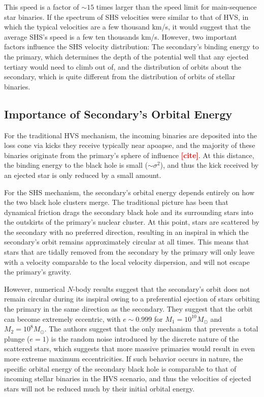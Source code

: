 \documentclass[a4paper,twocolumn]{emulateapj}
\newcommand{\colr}[1]{{\bf \textcolor{red}{[#1]}}}
\begin{document}
This speed is a factor of $\sim 15$ times larger than the speed limit for main-sequence star binaries. If the spectrum of SHS velocities were similar to that of HVS, in which the typical velocities are a few thousand km/s, it would suggest that the average SHS's speed is a few ten thousands km/s. However, two important factors influence the SHS velocity distribution: The secondary's binding energy to the primary, which determines the depth of the potential well that any ejected tertiary would need to climb out of, and the distribution of orbits about the secondary, which is quite different from the distribution of orbits of stellar binaries.

\subsection{Importance of Secondary's Orbital Energy}
For the traditional HVS mechanism, the incoming binaries are deposited into the loss cone via kicks they receive typically near apoapse, and the majority of these binaries originate from the primary's sphere of influence \colr{cite}. At this distance, the binding energy to the black hole is small ($\sim \sigma^{2}$), and thus the kick received by an ejected star is only reduced by a small amount.

For the SHS mechanism, the secondary's orbital energy depends entirely on how the two black hole clusters merge. The traditional picture has been that dynamical friction drags the secondary black hole and its surrounding stars into the outskirts of the primary's nuclear cluster. At this point, stars are scattered by the secondary with no preferred direction, resulting in an inspiral in which the secondary's orbit remains approximately circular at all times. This means that stars that are tidally removed from the secondary by the primary will only leave with a velocity comparable to the local velocity dispersion, and will not escape the primary's gravity.

However, numerical $N$-body results \citep{Iwasawa:2011a,Khan:2012a} suggest that the secondary's orbit does not remain circular during its inspiral owing to a preferential ejection of stars orbiting the primary in the same direction as the secondary. They suggest that the orbit can become extremely eccentric, with $e \sim 0.999$ for $M_{1} = 10^{10} M_{\odot}$ and $M_{2} = 10^{8} M_{\odot}$. The authors suggest that the only mechanism that prevents a total plunge ($e = 1$) is the random noise introduced by the discrete nature of the scattered stars, which suggests that more massive primaries would result in even more extreme maximum eccentricities. If such behavior occurs in nature, the specific orbital energy of the secondary black hole is comparable to that of incoming stellar binaries in the HVS scenario, and thus the velocities of ejected stars will not be reduced much by their initial orbital energy.
\end{document}
